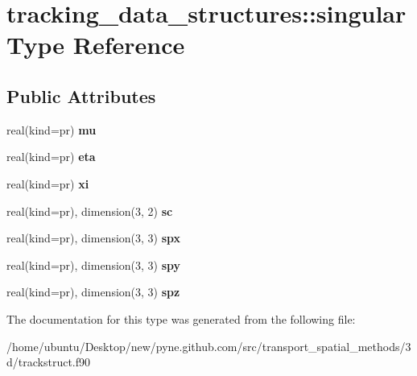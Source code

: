 \hypertarget{structtracking__data__structures_1_1singular}{}\section{tracking\+\_\+data\+\_\+structures\+:\+:singular Type Reference}
\label{structtracking__data__structures_1_1singular}
\subsection*{Public Attributes}
\begin{DoxyCompactItemize}
\item 
real(kind=pr) {\bfseries mu}\hypertarget{structtracking__data__structures_1_1singular_acd79fe7d9374778a1a073f01d33bc323}{}\label{structtracking__data__structures_1_1singular_acd79fe7d9374778a1a073f01d33bc323}

\item 
real(kind=pr) {\bfseries eta}\hypertarget{structtracking__data__structures_1_1singular_a8015e49ee70edd759eb801446b40de59}{}\label{structtracking__data__structures_1_1singular_a8015e49ee70edd759eb801446b40de59}

\item 
real(kind=pr) {\bfseries xi}\hypertarget{structtracking__data__structures_1_1singular_ac42e62b9f85705c6e68a6d07bc6c889c}{}\label{structtracking__data__structures_1_1singular_ac42e62b9f85705c6e68a6d07bc6c889c}

\item 
real(kind=pr), dimension(3, 2) {\bfseries sc}\hypertarget{structtracking__data__structures_1_1singular_ae99e040b2944a8f103cb730cef072f7b}{}\label{structtracking__data__structures_1_1singular_ae99e040b2944a8f103cb730cef072f7b}

\item 
real(kind=pr), dimension(3, 3) {\bfseries spx}\hypertarget{structtracking__data__structures_1_1singular_aeb81711c1d7153fe3dc8eae682f08134}{}\label{structtracking__data__structures_1_1singular_aeb81711c1d7153fe3dc8eae682f08134}

\item 
real(kind=pr), dimension(3, 3) {\bfseries spy}\hypertarget{structtracking__data__structures_1_1singular_ab7f1cf71b301b3dd7b30004bb3fecbea}{}\label{structtracking__data__structures_1_1singular_ab7f1cf71b301b3dd7b30004bb3fecbea}

\item 
real(kind=pr), dimension(3, 3) {\bfseries spz}\hypertarget{structtracking__data__structures_1_1singular_a5bfe4d508ca8ba24ddd3c14c20c03086}{}\label{structtracking__data__structures_1_1singular_a5bfe4d508ca8ba24ddd3c14c20c03086}

\end{DoxyCompactItemize}


The documentation for this type was generated from the following file\+:\begin{DoxyCompactItemize}
\item 
/home/ubuntu/\+Desktop/new/pyne.\+github.\+com/src/transport\+\_\+spatial\+\_\+methods/3d/trackstruct.\+f90\end{DoxyCompactItemize}
